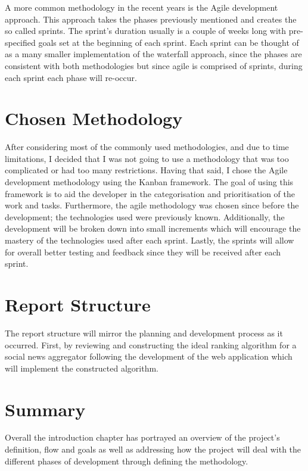 A more common methodology in the recent years is the Agile development approach. This approach takes the phases previously mentioned and creates the so called sprints. The sprint's duration usually is a couple of weeks long with pre-specified goals set at the beginning of each sprint. Each sprint can be thought of as a many smaller implementation of the waterfall approach, since the phases are consistent with both methodologies but since agile is comprised of sprints, during each sprint each phase will re-occur.

\section{Chosen Methodology}
After considering most of the commonly used methodologies, and due to time limitations, I decided that I was not going to use a methodology that was too complicated or had too many restrictions. Having that said, I chose the Agile development methodology using the Kanban framework. The goal of using this framework is to aid the developer in the categorisation and prioritisation of the work and tasks. Furthermore, the agile methodology was chosen since before the development; the technologies used were previously known. Additionally, the development will be broken down into small increments which will encourage the mastery of the technologies used after each sprint. Lastly, the sprints will allow for overall better testing and feedback since they will be received after each sprint.

\section{Report Structure}
The report structure will mirror the planning and development process as it occurred. First, by reviewing and constructing the ideal ranking algorithm for a social news aggregator following the development of the web application which will implement the constructed algorithm.

\section{Summary}
Overall the introduction chapter has portrayed an overview of the project's definition, flow and goals as well as addressing how the project will deal with the different phases of development through defining the methodology.
